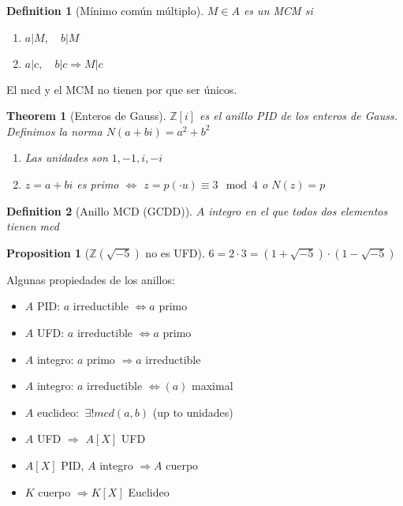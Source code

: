 \documentclass[leqno]{article}
\newtheorem*{theorem}{Theorem}
\newtheorem*{proposition}{Proposition}
\newtheorem*{definition}{Definition}
\begin{document}
\begin{definition}[Mínimo común múltiplo] $M\in A$ es un MCM si
  \begin{enumerate}[topsep=-6pt, itemsep=0pt]
    \item $a|M, \quad b|M$
	\item $a|c, \quad b|c \Rightarrow M|c$
  \end{enumerate}
\end{definition}

El mcd y el MCM no tienen por que ser únicos.

\begin{theorem}[Enteros de Gauss]  $\mathbb{Z}[i]$ es el anillo PID de los enteros de Gauss. Definimos la norma $N(a+bi)=a^2+b^2$
  \begin{enumerate}[topsep=-6pt, itemsep=0pt]
    \item Las unidades son $1, -1, i, -i$ 
	\item $z = a+bi$ es primo  $\iff$ $z=p(\cdot u)\equiv 3 \mod 4$ o $N(z)=p$ 
  \end{enumerate}
\end{theorem}

\begin{definition}[Anillo MCD (GCDD)] $A$ integro en el que todos dos elementos tienen mcd
  \end{definition}

\begin{proposition}[$\mathbb{Z}(\sqrt{-5} )$ no es UFD] $6 = 2 \cdot 3 = (1+\sqrt{-5} )\cdot (1-\sqrt{-5} )$
\end{proposition}

Algunas propiedades de los anillos:
\begin{itemize}[topsep=-6pt, itemsep=0pt]
  \item $A$ PID:  $a$ irreductible $\iff a$ primo
  \item $A$ UFD:  $a$ irreductible $\iff a$ primo
  \item $A$ integro:  $a$ primo  $\Rightarrow a$ irreductible
  \item $A$ integro: $a$ irreductible  $\iff (a)$ maximal 
  \item $A$ euclideo:  $\ \exists ! mcd(a,b)$ (up to unidades)
  \item $A$ UFD  $\Rightarrow$ $A[X]$ UFD
  \item $A[X]$ PID, $A$ integro $\Rightarrow A$ cuerpo
  \item $K$ cuerpo  $\Rightarrow K[X]$ Euclideo
\end{itemize}
\end{document}
